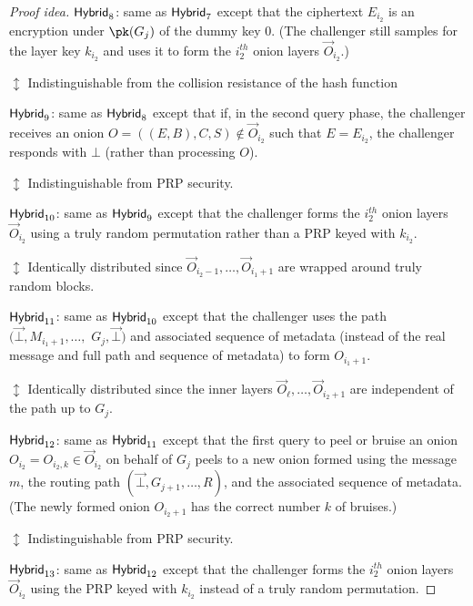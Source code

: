 \documentclass[runningheads,a4paper]{llncs}
\begin{document}
\begin{proof}[Proof idea]
\noindent $\mathsf{Hybrid}_{8}$: same as $\mathsf{Hybrid}_{7}$ except that the ciphertext $E_{i_2}$ is an encryption under $\pk(G_{j})$ of the dummy key $0$. (The challenger still samples for the layer key $k_{i_2}$ and uses it to form the $i_2^\mathit{th}$ onion layers $\vec{O}_{i_2}$.) 

    \textcolor{hybrid}{$\updownarrow$ Indistinguishable from the collision resistance of the hash function}

\noindent $\mathsf{Hybrid}_{9}$: same as $\mathsf{Hybrid}_{8}$ except that if, in the second query phase, the challenger receives an onion $O = ((E, B), C, S) \not\in \vec{O}_{i_2}$ such that $E=E_{i_2}$, the challenger responds with $\bot$ (rather than processing $O$). 

    \textcolor{hybrid}{$\updownarrow$ Indistinguishable from PRP security.}

\noindent $\mathsf{Hybrid}_{10}$: same as $\mathsf{Hybrid}_{9}$ except that the challenger forms the $i_2^\mathit{th}$ onion layers $\vec{O}_{i_2}$ using a truly random permutation rather than a PRP keyed with $k_{i_2}$. 

    \textcolor{hybrid}{$\updownarrow$ Identically distributed since $\vec{O}_{i_2-1}, \dots, \vec{O}_{i_1+1}$ are wrapped around truly random blocks.}

\noindent $\mathsf{Hybrid}_{11}$: same as $\mathsf{Hybrid}_{10}$ except that the challenger uses the path $(\vec{\bot}, M_{i_1+1}, \dots,$ $G_{j}, \vec{\bot})$ and associated sequence of metadata (instead of the real message and full path and sequence of metadata) to form $O_{i_1+1}$.

    \textcolor{hybrid}{$\updownarrow$ Identically distributed since the inner layers $\vec{O}_\ell, \dots, \vec{O}_{i_2+1}$ are independent of the path up to $G_j$.} 

\noindent $\mathsf{Hybrid}_{12}$: same as $\mathsf{Hybrid}_{11}$ except that the first query to peel or bruise an onion $O_{i_2} = O_{i_2, k} \in \vec{O}_{i_2}$ on behalf of $G_j$ peels to a new onion formed using the message $m$, the routing path $(\vec{\bot}, G_{j+1}, \dots, R)$, and the associated sequence of metadata. (The newly formed onion $O_{i_2+1}$ has the correct number $k$ of bruises.)

    \textcolor{hybrid}{$\updownarrow$ Indistinguishable from PRP security.}

\noindent $\mathsf{Hybrid}_{13}$: same as $\mathsf{Hybrid}_{12}$ except that the challenger forms the $i_2^\mathit{th}$ onion layers $\vec{O}_{i_2}$ using the PRP keyed with $k_{i_2}$ instead of a truly random permutation. 


\end{proof}
\end{document}
